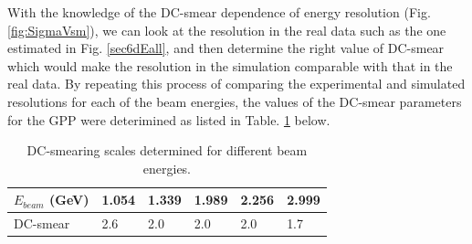 With the knowledge of the DC-smear dependence of energy resolution (Fig. \ref{fig:SigmaVsm}), we can look at the resolution in the real data such as the one estimated in Fig. \ref{sec6dEall}, 
and then determine the right value of DC-smear which would make the resolution in the simulation comparable with that in the real data. By repeating this process of comparing the experimental and simulated resolutions for each of the beam energies, the values of the DC-smear parameters for the GPP were deterimined as listed in Table. \ref{tab:dcSmears} below.


\begin{table}[H]%
\centering
    \caption{DC-smearing scales determined for different beam energies.}
    \label{tab:dcSmears}
    \begin{tabular}{ | l | l | l | l | l | l |}
    \hline
    $E_{beam}$ (GeV) & 1.054  & 1.339 & 1.989 & 2.256 & 2.999 \\ \hline
    DC-smear         & 2.6    & 2.0   & 2.0   & 2.0   & 1.7 \\  \hline
    \end{tabular}
\end{table}




